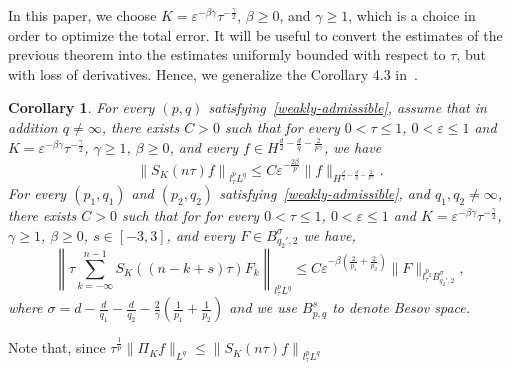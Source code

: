 \documentclass[10pt,a4paper]{article}
\newtheorem{corollary}[theorem]{Corollary}
\begin{document}

  In this paper, we choose \(K=\varepsilon^{-\beta\gamma}\tau^{-\frac\gamma2}\),
  \(\beta\geq0\), and \(\gamma \geq 1\), which is a choice in order to optimize
  the total error. It will be useful to convert the estimates of the previous
  theorem into the estimates uniformly bounded with respect to \(\tau\), but
  with loss of derivatives. Hence, we generalize the Corollary \(4.3\)
  in~\cite{ORS21}.

  \begin{corollary}\label{corDSE}
    For every \((p,q)\) satisfying~\eqref{weakly-admissible}, assume that in addition
    \(q\neq \infty\), there exists \(C>0\) such that 
    for every \(0<\tau \leq 1\), \( 0 < \varepsilon \leq 1 \) and 
    \(K = \varepsilon^{-\beta\gamma}\tau^{-\frac\gamma2}\), \(\gamma \geq 1\), 
    \(\beta \geq 0\), and every \(f \in H^{\frac{d}2-\frac{d}q-\frac2{p\gamma}}\), we have
    \begin{equation}
    \label{Tloss}
      \left\| S_K (n\tau) f\right\|_{l^p_\tau L^q} \leq C \varepsilon^{-\frac{2\beta}p} 
      \|f \|_{H^{\frac{d}2-\frac{d}q-\frac2{p\gamma}}}. 
    \end{equation}
    For every \((p_1, q_1)\) and \((p_2, q_2)\) satisfying~\eqref{weakly-admissible}, 
    and \(q_1, q_2 \neq \infty\),
    there exists \(C>0\) such that for 
    for every \(0<\tau \leq 1\), \( 0 < \varepsilon \leq 1 \) and 
    \(K = \varepsilon^{-\beta\gamma}\tau^{-\frac\gamma2}\), \(\gamma \geq 1\), 
    \(\beta \geq 0\), \(s \in [-3,3]\), and every \(F \in 
    B^{\sigma}_{q_2',2}\)
    we have,
    \begin{equation}
    \label{TT*losscomplicate}
      \left\| \tau \sum_{k=-\infty}^{n-1} S_K ((n-k+s)\tau) F_k \right\|_{l^p_\tau L^q} 
      \leq C \varepsilon^{-\beta(\frac2{p_1}+\frac2{p_2})} \|F\|_{l^{p_2}_\tau 
      B^{\sigma}_{q_2',2}},
    \end{equation}
    where \(\sigma=d-\frac{d}{q_1}-\frac{d}{q_2}-\frac2{\gamma}(\frac1{p_1}+\frac1{p_2})\)
    and we use \(B^s_{p,q}\) to denote Besov space.
  \end{corollary}
  Note that, since \(\tau^\frac1p\| \Pi_{K} f\|_{L^q} \leq  \left\| S_{K}(n \tau) f\right\|_{l^p_{\tau}L^q}\) 
\end{document}
